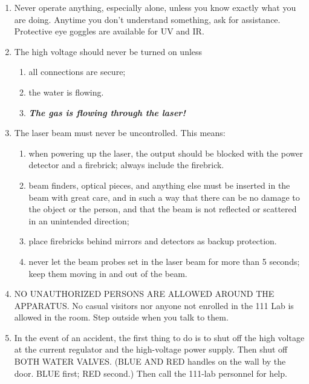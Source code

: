 \documentclass{../lab}
\begin{document}
\begin{enumerate}
    \item Never operate anything, especially alone, unless you know exactly what you are doing. Anytime you don't understand something, ask for assistance. Protective eye goggles are available for UV and IR.

    \item The high voltage should never be turned on unless
    \begin{enumerate}
        \item all connections are secure;

        \item the water is flowing.

        \item \emph{\textbf{The gas is flowing through the laser!}}

    \end{enumerate}

    \item The laser beam must never be uncontrolled. This means:
    \begin{enumerate}
        \item when powering up the laser, the output should be blocked with the power detector and a firebrick; always include the firebrick.

        \item beam finders, optical pieces, and anything else must be inserted in the beam with great care, and in such a way that there can be no damage to the object or the person, and that the beam is not reflected or scattered in an unintended direction;

        \item place firebricks behind mirrors and detectors as backup protection.

        \item never let the beam probes set in the laser beam for more than 5 seconds; keep them moving in and out of the beam.

    \end{enumerate}

    \item NO UNAUTHORIZED PERSONS ARE ALLOWED AROUND THE APPARATUS. No casual visitors nor anyone not enrolled in the 111 Lab is allowed in the room. Step outside when you talk to them.

    \item In the event of an accident, the first thing to do is to shut off the high voltage at the current regulator and the high-voltage power supply. Then shut off BOTH WATER VALVES. (BLUE AND RED handles on the wall by the door. BLUE first; RED second.) Then call the 111-lab personnel for help.

\end{enumerate}
\end{document}
